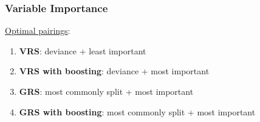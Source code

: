 \documentclass{beamer}
\begin{document}

\begin{frame}

    \frametitle{Variable Importance}
    
    \bigskip
    \underline{Optimal pairings}:

        \begin{enumerate}
            \item \textbf{VRS}: deviance + least important
            \medskip
            \item \textbf{VRS with boosting}: deviance + most important
            \medskip
            \item \textbf{GRS}: most commonly split + most important
            \medskip
            \item \textbf{GRS with boosting}: most commonly split + most important
            \medskip
        \end{enumerate}

\end{frame}
\end{document}
